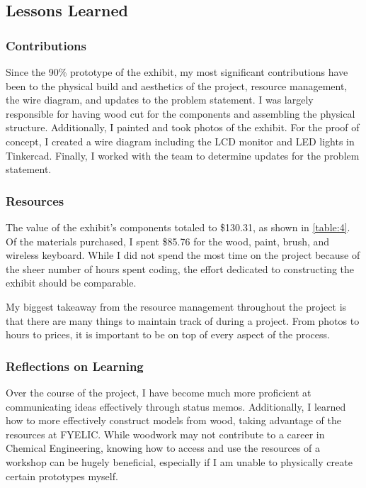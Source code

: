 \documentclass[conference]{IEEEtran}
\begin{document}
\subsection{Lessons Learned}

\subsubsection{Contributions}

\par Since the 90\% prototype of the exhibit, my most significant contributions have been to the physical build and aesthetics of the project, resource management, the wire diagram, and updates to the problem statement.  I was largely responsible for having wood cut for the components and assembling the physical structure.  Additionally, I painted and took photos of the exhibit.  For the proof of concept, I created a wire diagram including the LCD monitor and LED lights in Tinkercad.  Finally, I worked with the team to determine updates for the problem statement.

\subsubsection{Resources}

\par The value of the exhibit’s components totaled to \$130.31, as shown in \ref{table:4}. Of the materials purchased, I spent \$85.76 for the wood, paint, brush, and wireless keyboard.  While I did not spend the most time on the project because of the sheer number of hours spent coding, the effort dedicated to constructing the exhibit should be comparable.  
\par My biggest takeaway from the resource management throughout the project is that there are many things to maintain track of during a project.  From photos to hours to prices, it is important to be on top of every aspect of the process.

\subsubsection{Reflections on Learning}

\par Over the course of the project, I have become much more proficient at communicating ideas effectively through status memos.  Additionally, I learned how to more effectively construct models from wood, taking advantage of the resources at FYELIC.  While woodwork may not contribute to a career in Chemical Engineering, knowing how to access and use the resources of a workshop can be hugely beneficial, especially if I am unable to physically create certain prototypes myself.  
\end{document}
